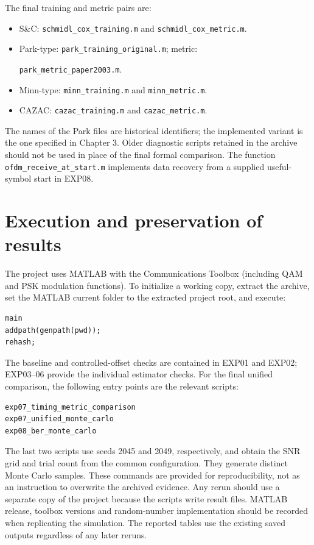 The final training and metric pairs are:
\begin{itemize}
\item S\&C: \verb|schmidl_cox_training.m| and \verb|schmidl_cox_metric.m|.
\item Park-type: \verb|park_training_original.m|; metric:
\par\noindent\verb|park_metric_paper2003.m|.
\item Minn-type: \verb|minn_training.m| and \verb|minn_metric.m|.
\item CAZAC: \verb|cazac_training.m| and \verb|cazac_metric.m|.
\end{itemize}
The names of the Park files are historical identifiers; the implemented
variant is the one specified in Chapter 3. Older diagnostic scripts retained
in the archive should not be used in place of the final formal comparison.
The function \verb|ofdm_receive_at_start.m| implements data recovery from a
supplied useful-symbol start in EXP08.

\section{Execution and preservation of results}
The project uses MATLAB with the Communications Toolbox (including QAM and
PSK modulation functions). To initialize a working copy, extract the archive,
set the MATLAB current folder to the extracted project root, and execute:
\begin{verbatim}
main
addpath(genpath(pwd));
rehash;
\end{verbatim}
The baseline and controlled-offset checks are contained in EXP01 and EXP02;
EXP03--06 provide the individual estimator checks. For the final unified
comparison, the following entry points are the relevant scripts:
\begin{verbatim}
exp07_timing_metric_comparison
exp07_unified_monte_carlo
exp08_ber_monte_carlo
\end{verbatim}
The last two scripts use seeds 2045 and 2049, respectively, and obtain the
SNR grid and trial count from the common configuration. They generate distinct
Monte Carlo samples. These commands are provided for reproducibility, not as
an instruction to overwrite the archived evidence. Any rerun should use a
separate copy of the project because the scripts write result files. MATLAB
release, toolbox versions and random-number implementation should be recorded
when replicating the simulation. The reported tables use the existing saved
outputs regardless of any later reruns.

